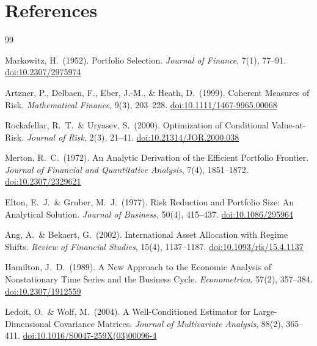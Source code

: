 \documentclass[12pt,openany]{book}
\numberwithin{equation}{chapter}
\theoremstyle{plain}
\theoremstyle{definition}
\theoremstyle{remark}
\begin{document}
\chapter*{References}

\begin{thebibliography}{99}

Markowitz, H.\ (1952).
Portfolio Selection.
\textit{Journal of Finance}, 7(1), 77--91.
\href{https://doi.org/10.2307/2975974}{doi:10.2307/2975974}

Artzner, P., Delbaen, F., Eber, J.-M., \& Heath, D.\ (1999).
Coherent Measures of Risk.
\textit{Mathematical Finance}, 9(3), 203--228.
\href{https://doi.org/10.1111/1467-9965.00068}{doi:10.1111/1467-9965.00068}

Rockafellar, R.\ T.\ \& Uryasev, S.\ (2000).
Optimization of Conditional Value-at-Risk.
\textit{Journal of Risk}, 2(3), 21--41.
\href{https://doi.org/10.21314/JOR.2000.038}{doi:10.21314/JOR.2000.038}

Merton, R.\ C.\ (1972).
An Analytic Derivation of the Efficient Portfolio Frontier.
\textit{Journal of Financial and Quantitative Analysis}, 7(4), 1851--1872.
\href{https://doi.org/10.2307/2329621}{doi:10.2307/2329621}

Elton, E.\ J.\ \& Gruber, M.\ J.\ (1977).
Risk Reduction and Portfolio Size: An Analytical Solution.
\textit{Journal of Business}, 50(4), 415--437.
\href{https://doi.org/10.1086/295964}{doi:10.1086/295964}

Ang, A.\ \& Bekaert, G.\ (2002).
International Asset Allocation with Regime Shifts.
\textit{Review of Financial Studies}, 15(4), 1137--1187.
\href{https://doi.org/10.1093/rfs/15.4.1137}{doi:10.1093/rfs/15.4.1137}

Hamilton, J.\ D.\ (1989).
A New Approach to the Economic Analysis of Nonstationary Time Series
and the Business Cycle.
\textit{Econometrica}, 57(2), 357--384.
\href{https://doi.org/10.2307/1912559}{doi:10.2307/1912559}

Ledoit, O.\ \& Wolf, M.\ (2004).
A Well-Conditioned Estimator for Large-Dimensional Covariance Matrices.
\textit{Journal of Multivariate Analysis}, 88(2), 365--411.
\href{https://doi.org/10.1016/S0047-259X(03)00096-4}{doi:10.1016/S0047-259X(03)00096-4}


\end{thebibliography}
\end{document}
